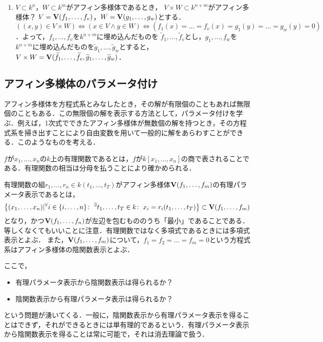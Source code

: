 \documentclass[9pt]{ltjsarticle}
\begin{document}
\begin{enumerate}[label=(問題\arabic*)]
\begin{enumerate}[label=(\alph*)]
 \item $V\subset k^n$，$W\subset k^m$がアフィン多様体であるとき，
$V\times W \subset k^{n+m}$がアフィン多様体？
$V=\textbf V(f_1,\dots,f_v)$，$W=\textbf V(g_1,\dots,g_w)$とする．
$((x,y)\in V\times W) \iff (x\in V \land y\in W) \iff (f_1(x)=\dots = f_v(x) = g_1(y)=\dots = g_w(y)=0)$．よって，$f_1,\dots,f_v$を$k^{n+m}$に埋め込んだものを
$\tilde f_1,\dots, \tilde f_v$とし，$g_1,\dots, f_w$を$k^{n+m}$に埋め込んだものを$\tilde g_1,\dots, \tilde g_w$とすると，$V\times W = \textbf V(\widetilde f_1,\dots,\widetilde f_v,\widetilde g_1,\dots, \widetilde g_w)$．
\end{enumerate}
\end{enumerate}

\subsection{アフィン多様体のパラメータ付け}
アフィン多様体を方程式系とみなしたとき，その解が有限個のこともあれば無限個のこともある．この無限個の解を表示する方法として，パラメータ付けを学ぶ．例えば，1次式でできたアフィン多様体が無数個の解を持つとき，その方程式系を掃き出すことにより自由変数を用いて一般的に解をあらわすことができる．このようなものを考える．

$f$が$x_1,\dots,x_n$の$k$上の有理関数であるとは，$f$が$k[x_1,\dots,x_n]$の商で表されることである．有理関数の相当は分母を払うことにより確かめられる．

有理関数の組$r_1,\dots,r_n \in k(t_1,\dots,t_T)$がアフィン多様体$\textbf V(f_1,\dots,f_m)$の有理パラメータ表示であるとは，
\begin{align}
\left\{(x_1,\dots,x_n) | {}^{\forall}{i\in \left\{i,\dots,n\right\}}\mathrm{\colon\;} {}^{\exists}{t_1,\dots,t_T \in k}\mathrm{\colon\;} x_i = r_i(t_1,\dots,t_T)\right\} \subset \textbf V(f_1,\dots,f_m)
\end{align}
となり，かつ$\textbf V(f_1,\dots,f_n)$が左辺を包むもののうち「最小」であることである．等しくなくてもいいことに注意．有理関数ではなく多項式であるときには多項式表示とよぶ．
また，$\textbf V(f_1,\dots,f_m)$について，$f_1=f_2=\dots=f_m=0$という方程式系はアフィン多様体の陰関数表示とよぶ．

ここで，
\begin{itemize}
 \item 有理パラメータ表示から陰関数表示は得られるか？
 \item 陰関数表示から有理パラメータ表示は得られるか？
\end{itemize}
という問題が湧いてくる．一般に，陰関数表示から有理パラメータ表示を得ることはできず，それができるときには単有理的であるという．有理パラメータ表示から陰関数表示を得ることは常に可能で，それは消去理論で扱う．
\end{document}
